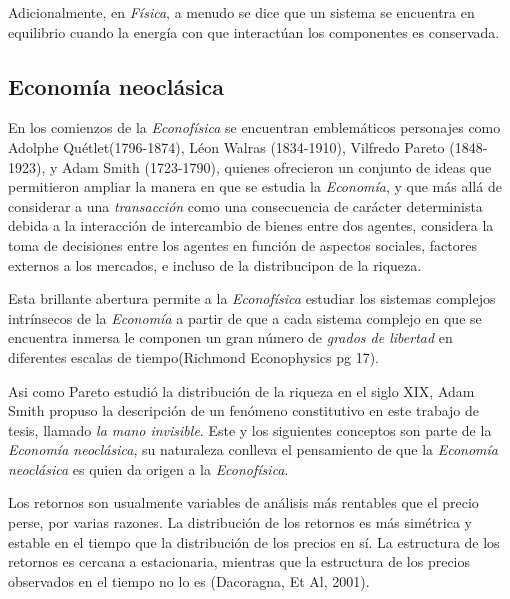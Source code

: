 Adicionalmente, en \textit{Física}, a menudo se dice que un sistema se encuentra en equilibrio cuando la energía con que interactúan los componentes es conservada. 


\subsection{Economía neoclásica} 

En los comienzos de la \textit{Econofísica} se encuentran emblemáticos personajes como Adolphe Quétlet(1796-1874), Léon Walras (1834-1910), Vilfredo Pareto (1848-1923), y Adam Smith (1723-1790), quienes ofrecieron un conjunto de ideas que permitieron ampliar la manera en que se estudia la \textit{Economía}, y que más allá de considerar a una \textit{transacción} como una consecuencia de carácter determinista debida a la interacción de intercambio de bienes entre dos agentes, considera la toma de decisiones entre los agentes en función de aspectos sociales, factores externos a los mercados, e incluso de la distribucipon de la riqueza.
\newline

Esta brillante abertura permite a la \textit{Econofísica} estudiar los sistemas complejos intrínsecos de la \textit{Economía} a partir de que a cada sistema complejo en que se encuentra inmersa le componen un gran número de \textit{grados de libertad} en diferentes escalas de tiempo(Richmond Econophysics pg 17).
\newline

Asi como Pareto estudió la distribución de la riqueza en el siglo XIX, Adam Smith propuso la descripción de un fenómeno constitutivo en este trabajo de tesis, llamado \textit{la mano invisible}. Este y los siguientes conceptos son parte de la \textit{Economía neoclásica}, su naturaleza conlleva el pensamiento de que la \textit{Economía neoclásica} es quien da origen a la \textit{Econofísica}.

Los retornos son usualmente variables de análisis más rentables que el precio perse, por varias razones. La distribución de los retornos es más simétrica y estable en el tiempo que la distribución de los precios en sí. La estructura de los retornos es cercana a estacionaria, mientras que la estructura de los precios observados en el tiempo no lo es (Dacoragna, Et Al, 2001).
\newpage


